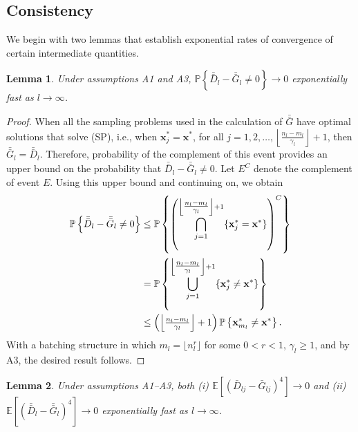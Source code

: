 \documentclass[12pt]{article}
\newtheorem{lemma}{Lemma}
\newcommand{\p}[1]{\mathbb{P} \left\{ #1 \right\}}
\newcommand{\e}[1]{\mathbb{E} \left[ #1 \right]
}
\newcommand{\x}{\mathbf{x}}
\newcommand{\xs}{\x^*}
\newcommand{\nbl}{\left\lfloor\tfrac{n_l-m_l}{\gamma_l}\right\rfloor+1}
\newcommand{\gb}{\bar{G}}
\newcommand{\gbb}{\bar{\gb}}
\newcommand{\db}{\bar{D}}
\newcommand{\dbb}{\bar{\db}}
\begin{document}
\subsection{Consistency}
\label{subsec:conv} 

We begin with two lemmas that establish exponential rates of convergence of certain intermediate quantities.

\begin{lemma} \label{lem:gbb_prob}
	Under assumptions A1 and A3, $\p{\dbb_l - \gbb_l \neq 0} \rightarrow 0$ exponentially fast as $l \rightarrow \infty$.
\end{lemma}

\begin{proof} When all the sampling problems used in the calculation of $\gbb$ have optimal solutions that solve (SP), i.e., when $\xs_{j} = \xs$, for all $j=1,2,\ldots, \nbl$, then $\gbb_l = \dbb_l$. 
Therefore, probability of the complement of this event provides an upper bound on the probability that $\dbb_l - \gbb_l \neq 0$. 
Let $E^C$ denote the complement of event $E$. 
Using this upper bound and continuing on, we obtain
	\begin{align}
		\p{\dbb_l - \gbb_l \neq 0} & \leq \p{\left( \bigcap_{j=1}^{\nbl} \{\xs_{j} = \xs\} \right)^C} \notag \\
		& = \p{ \bigcup_{j=1}^{\nbl} \{\xs_{j} \neq \xs\}} \notag \\
		& \leq \left( \nbl\right) \p{ \xs_{m_l} \neq \xs }. \notag
	\end{align}
	With a batching structure in which $m_l = \lfloor n_l^{r} \rfloor$ for some $0<r<1$,  $\gamma_l \geq 1$, and by A3, the desired result follows.
\end{proof}

\begin{lemma} \label{lem:gb_gbb_l4}
	Under assumptions A1--A3, both (i) $\e{(\db_{lj} - \gb_{lj})^4} \rightarrow 0$ and (ii) $\e{(\dbb_l - \gbb_l)^4} \rightarrow 0$ exponentially fast as $l \rightarrow \infty$.
\end{lemma}
\end{document}
